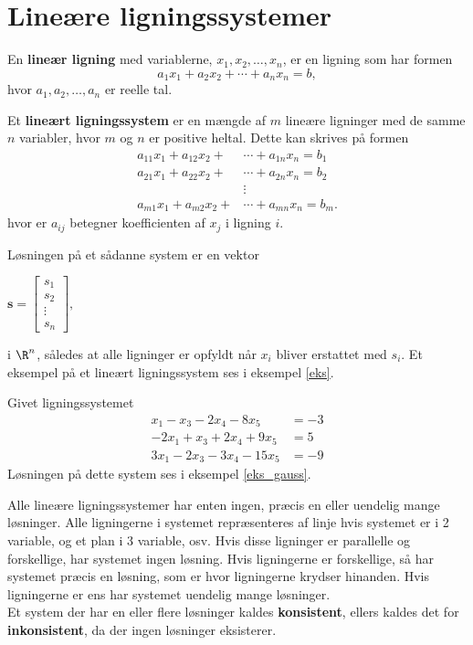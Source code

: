 \section{Lineære ligningssystemer }
%
En \textbf{lineær ligning} med variablerne, $x_1,x_2,\ldots ,x_n$, er en ligning som har formen
$$ a_1x_1+a_2x_2+\cdots+a_nx_n=b,$$ 
hvor $a_1,a_2,\ldots,a_n$ er reelle tal. 
%
\begin{defn}{}{}
Et \textbf{lineært ligningssystem} er en mængde af $m$ lineære ligninger  med de samme $n$ variabler, hvor $m$ og $n$ er positive heltal.
Dette kan skrives på formen
\begin{align*}
a_{11}x_1+a_{12}x_2+&\cdots+a_{1n}x_n=b_1\\
a_{21}x_1+a_{22}x_2+&\cdots+a_{2n}x_n=b_2\\
&\vdots\\
a_{m1}x_1+a_{m2}x_2+&\cdots +a_{mn}x_n=b_m.
\end{align*}
hvor er $a_{ij}$ betegner koefficienten af $x_j$ i ligning $i$.
\end{defn}
\noindent
Løsningen på et sådanne system er en vektor
\begin{center}
$
\mathbf{s} = 
\begin{bmatrix}
s_1\\
s_2\\
\vdots\\
s_n
\end{bmatrix},
$
\end{center}
i $\R ^n$, således at alle ligninger er opfyldt når $x_i$ bliver erstattet med $s_i$. Et eksempel på et lineært ligningssystem ses i eksempel \ref{eks}.
%
\\
\begin{eks}
\label{eks}
Givet ligningssystemet
%
\begin{align*}
x_1-x_3-2x_4-8x_5&=-3 \\
-2x_1+x_3+2x_4+9x_5&=5 \\
3x_1-2x_3-3x_4-15x_5&=-9
\end{align*}
%
Løsningen på dette system ses i eksempel \ref{eks_gauss}.
%
%
\end{eks}
Alle lineære ligningssystemer har enten ingen, præcis en eller uendelig mange løsninger.
Alle ligningerne i systemet repræsenteres af linje hvis systemet er i 2 variable, og et plan i 3 variable, osv.
Hvis disse ligninger er parallelle og forskellige, har systemet ingen løsning.
Hvis ligningerne er forskellige, så har systemet præcis en løsning, som er hvor ligningerne krydser hinanden. 
Hvis ligningerne er ens har systemet uendelig mange løsninger.\\
Et system der har en eller flere løsninger kaldes \textbf{konsistent}, ellers kaldes det for \textbf{inkonsistent}, da der ingen løsninger eksisterer.
